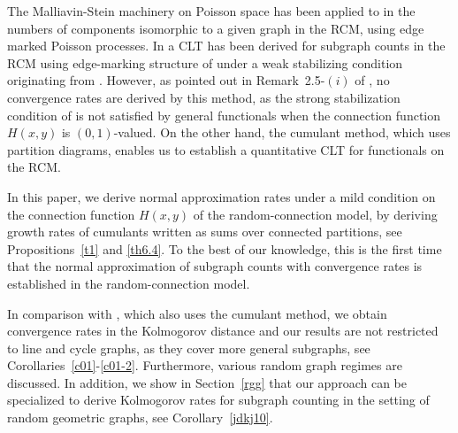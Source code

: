 \documentclass[12pt]{article}
\numberwithin{equation}{section}
\begin{document}
   The Malliavin-Stein machinery on Poisson space \cite{lastpeccatipenrose} has been applied to in \cite{LNS21} the numbers of components isomorphic to a given graph in the RCM, using edge marked Poisson processes.
   In \cite{can2022} a CLT has been derived for subgraph counts in the RCM
   using edge-marking structure of \cite{LNS21} 
   under a weak stabilizing condition originating from \cite{penrose01}. 
   However, as pointed out in Remark~2.5-$(i)$ of \cite{can2022},
   no convergence rates are derived by this method, as 
   the strong stabilization condition of \cite{penrose05,lachiezerey4}
   is not satisfied by general functionals
   when the connection function $H(x,y)$ is $(0,1)$-valued. 
 On the other hand, the cumulant method, which uses partition diagrams, enables us to establish a quantitative CLT for functionals on the RCM. %

\medskip 

 In this paper, we derive normal approximation rates under a mild condition
 on the connection function $H(x,y)$ of the random-connection model,
 by deriving growth rates of cumulants written as sums over
 connected partitions, see Propositions~\ref{t1} and \ref{th6.4}. 
 To the best of our knowledge, this is the first time that the normal approximation
 of subgraph counts with convergence rates is established
 in the random-connection model.
 
\medskip 

 In comparison with \cite{khorunzhiy}, which also uses the cumulant method, 
 we obtain convergence rates in the Kolmogorov distance and our results are 
 not restricted to line and cycle graphs, as they cover more general subgraphs,
 see Corollaries~\ref{c01}-\ref{c01-2}. 
 Furthermore, various random graph regimes are discussed.
 In addition,
   we show in Section~\ref{rgg} that our approach can be
   specialized to derive Kolmogorov rates for
   subgraph counting in the setting of random geometric graphs,
   see Corollary~\ref{jdkj10}. 
 
\end{document}
